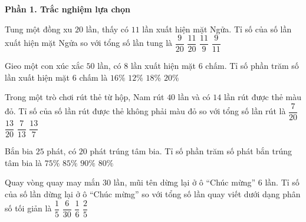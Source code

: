 \textbf{Phần 1. Trắc nghiệm lựa chọn}

\begin{ex} %
Tung một đồng xu $20$ lần, thấy có $11$ lần xuất hiện mặt Ngửa. Tỉ số của số lần xuất hiện mặt Ngửa so với tổng số lần tung là
\choice
{$\dfrac{9}{20}$}
{\True $\dfrac{11}{20}$}
{$\dfrac{11}{9}$}
{$\dfrac{9}{11}$}
\end{ex}

\begin{ex} %
Gieo một con xúc xắc $50$ lần, có $8$ lần xuất hiện mặt $6$ chấm. Tỉ số phần trăm số lần xuất hiện mặt $6$ chấm là
\choice
{\True $16\%$}
{$12\%$}
{$18\%$}
{$20\%$}
\end{ex}

\begin{ex} %
Trong một trò chơi rút thẻ từ hộp, Nam rút $40$ lần và có $14$ lần rút được thẻ màu đỏ. Tỉ số của số lần rút được thẻ không phải màu đỏ so với tổng số lần rút là
\choice
{$\dfrac{7}{20}$}
{\True $\dfrac{13}{20}$}
{$\dfrac{7}{13}$}
{$\dfrac{13}{7}$}
\end{ex}

\begin{ex} %
Bắn bia $25$ phát, có $20$ phát trúng tâm bia. Tỉ số phần trăm số phát bắn trúng tâm bia là
\choice
{$75\%$}
{$85\%$}
{$90\%$}
{\True $80\%$}
\end{ex}

\begin{ex} %
Quay vòng quay may mắn $30$ lần, mũi tên dừng lại ở ô “Chúc mừng” $6$ lần. Tỉ số của số lần dừng lại ở ô “Chúc mừng” so với tổng số lần quay viết dưới dạng phân số tối giản là
\choice
{\True $\dfrac{1}{5}$}
{$\dfrac{6}{30}$}
{$\dfrac{1}{6}$}
{$\dfrac{2}{5}$}
\end{ex}

